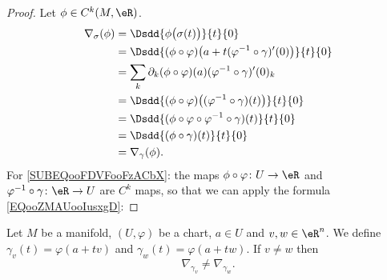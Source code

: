 \begin{proof}
    Let \( \phi\in C^k(M, \eR)\). 
    \begin{subequations}
        \begin{align}
            \nabla_{\sigma}(\phi)&=\Dsdd{ \phi\big( \sigma(t) \big) }{t}{0}\\
            &=\Dsdd{ (\phi\circ \varphi)\big( a+t(\varphi^{-1}\circ\gamma)'(0) \big) }{t}{0}\\
            &=\sum_k\partial_k(\phi\circ\varphi)(a)(\varphi^{-1}\circ\gamma)'(0)_k  \label{SUBEQooFDVFooFzACbX}\\
            &=\Dsdd{ (\phi\circ\varphi)\big( (\varphi^{-1}\circ\gamma)(t) \big) }{t}{0}\\
            &=\Dsdd{ (\phi\circ\varphi\circ\varphi^{-1}\circ\gamma)(t) }{t}{0}\\
            &=\Dsdd{ (\phi\circ\gamma)(t) }{t}{0}\\
            &=\nabla_{\gamma}(\phi).
        \end{align}
    \end{subequations}
    For \eqref{SUBEQooFDVFooFzACbX}: the maps \( \phi\circ\varphi\colon U\to \eR\) and \( \varphi^{-1}\circ\gamma\colon \eR\to U\) are \( C^k\) maps, so that we can apply the formula \eqref{EQooZMAUooIusxgD}:
\end{proof}

\begin{lemma}       \label{LEMooGPCBooXMTddG}
    Let \( M\) be a manifold, \( (U,\varphi)\) be a chart, \( a\in U\) and \( v,w\in \eR^n\). We define \( \gamma_v(t)=\varphi(a+tv)\) and \( \gamma_w(t)=\varphi(a+tw)\). If \( v\neq w\) then 
    \begin{equation}
        \nabla_{\gamma_v}\neq \nabla_{\gamma_w}.
    \end{equation}
\end{lemma}

